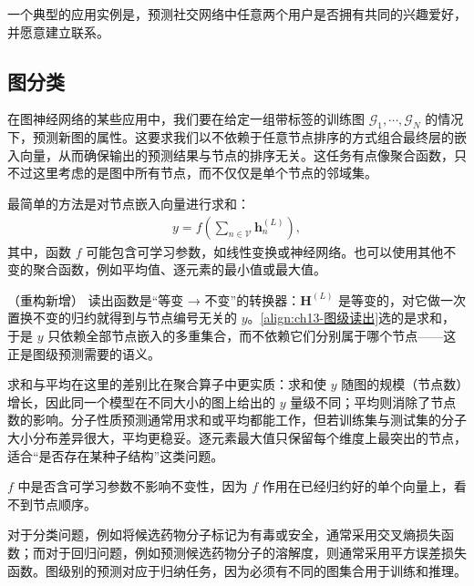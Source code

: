 \documentclass[../../main.tex]{subfiles}
\begin{document}
\begin{example}[ 社交网络中的边预测]\label{example:ch13-社交网络边预测}
一个典型的应用实例是，预测社交网络中任意两个用户是否拥有共同的兴趣爱好，并愿意建立联系。
\end{example}

\subsection{图分类}\label{subsection:ch13-图分类}

在图神经网络的某些应用中，我们要在给定一组带标签的训练图 $\mathcal{G}_1,\cdots,\mathcal{G}_N$ 的情况下，预测新图的属性。这要求我们以不依赖于任意节点排序的方式组合最终层的嵌入向量，从而确保输出的预测结果与节点的排序无关。这任务有点像聚合函数，只不过这里考虑的是图中所有节点，而不仅仅是单个节点的邻域集。

\begin{definition}[图级读出函数]\label{definition:ch13-图级读出}
最简单的方法是对节点嵌入向量进行求和：
\begin{align}
y=f\!\left(\sum_{n\in\mathcal{V}}\bm{h}_n^{(L)}\right),
\label{align:ch13-图级读出}
\end{align}
其中，函数 $f$ 可能包含可学习参数，如线性变换或神经网络。也可以使用其他不变的聚合函数，例如平均值、逐元素的最小值或最大值。
\end{definition}

\begin{remark}（重构新增）
读出函数是“等变 → 不变”的转换器：$\bm{H}^{(L)}$ 是等变的，对它做一次置换不变的归约就得到与节点编号无关的 $y$。\eqref{align:ch13-图级读出}选的是求和，于是 $y$ 只依赖全部节点嵌入的多重集合，而不依赖它们分别属于哪个节点——这正是图级预测需要的语义。\par
求和与平均在这里的差别比在聚合算子中更实质：求和使 $y$ 随图的规模（节点数）增长，因此同一个模型在不同大小的图上给出的 $y$ 量级不同；平均则消除了节点数的影响。分子性质预测通常用求和或平均都能工作，但若训练集与测试集的分子大小分布差异很大，平均更稳妥。逐元素最大值只保留每个维度上最突出的节点，适合“是否存在某种子结构”这类问题。\par
$f$ 中是否含可学习参数不影响不变性，因为 $f$ 作用在已经归约好的单个向量上，看不到节点顺序。
\end{remark}

\begin{example}[ 候选药物分子的图分类]\label{example:ch13-药物分子图分类}
对于分类问题，例如将候选药物分子标记为有毒或安全，通常采用交叉熵损失函数；而对于回归问题，例如预测候选药物分子的溶解度，则通常采用平方误差损失函数。图级别的预测对应于归纳任务，因为必须有不同的图集合用于训练和推理。
\end{example}
\end{document}

